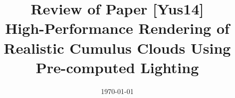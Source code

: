 \documentclass[a4paper, 11pt, oneside]{report}         %
\author{\textbf{\begin{large}
Huanxiang Wang
\end{large}} \\14333168}
\title{{\Huge Review of Paper [Yus14]} \\ \textbf{High-Performance Rendering of Realistic Cumulus Clouds
Using Pre-computed Lighting}}
\date{\today}
\begin{document}
\maketitle

\tableofcontents
\listoffigures
                              

       



%
%



\begin{thebibliography}{ieeetr}                   %



\end{thebibliography}                             %
\end{document}
